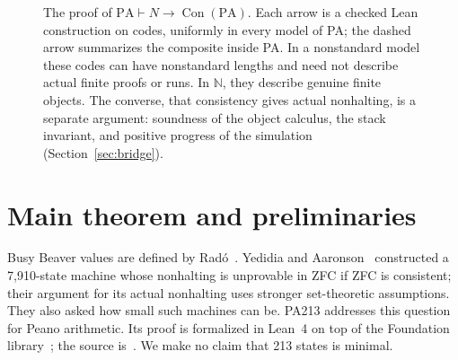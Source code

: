 \documentclass[11pt,letterpaper]{article}
\newcommand{\PA}{\mathrm{PA}}
\newcommand{\NN}{\mathbb{N}}
\newcommand{\Con}{\operatorname{Con}}
\begin{document}
\begin{figure}[ht]
\centering
{}
\caption{The proof of $\PA\vdash N\to\Con(\PA)$. Each arrow is a checked
Lean construction on codes, uniformly in every model of PA; the dashed
arrow summarizes the composite inside PA. In a nonstandard model these
codes can have nonstandard lengths and need not describe actual finite
proofs or runs. In $\NN$, they describe genuine finite objects. The
converse, that consistency gives actual nonhalting, is a separate argument:
soundness of the object calculus, the stack invariant, and positive
progress of the simulation (Section~\ref{sec:bridge}).}
\label{fig:pipeline}
\end{figure}

\section{Main theorem and preliminaries}

Busy Beaver values are defined by Rad\'o~\cite{rado}. Yedidia and
Aaronson~\cite{yedidia} constructed a 7,910-state machine whose
nonhalting is unprovable in ZFC if ZFC is consistent; their argument for
its actual nonhalting uses stronger set-theoretic assumptions. They also
asked how small such machines can be. PA213 addresses this question for
Peano arithmetic. Its proof is
formalized in Lean~4 on top of the Foundation library~\cite{foundation};
the source is~\cite{project}. We make no claim that 213 states is minimal.
\end{document}
